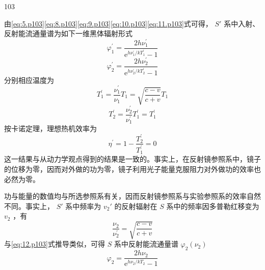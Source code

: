 \begin{solution}{103}
\begin{subsolution}
\begin{equation}
            \label{eq:11.p103}
        \end{equation}
        由\eqref{eq:5.p103}\eqref{eq:8.p103}\eqref{eq:9.p103}\eqref{eq:10.p103}\eqref{eq:11.p103}式可得， $S'$ 系中入射、反射能流通量谱为如下一维黑体辐射形式
        \begin{equation}
            \varphi_ {1} ^ {\prime} = \frac {2 h \nu_ {1} ^ {\prime}}{\mathrm{e} ^ {h \nu_ {1} ^ {\prime} / k T _ {1} ^ {\prime}} - 1}
            \label{eq:12.p103}
        \end{equation}
        \begin{equation}
            \varphi_ {2} ^ {\prime} = \frac {2 h \nu_ {2} ^ {\prime}}{\mathrm{e} ^ {h \nu_ {2} ^ {\prime} / k T _ {2} ^ {\prime}} - 1}
            \label{eq:13.p103}
        \end{equation}
        分别相应温度为
        \begin{equation}
            T _ {1} ^ {\prime} = \frac {\nu_ {1} ^ {\prime}}{\nu_ {1}} T _ {1} = \sqrt {\frac {c - v}{c + v}} T _ {1}
            \label{eq:14.p103}
        \end{equation}
        \begin{equation}
            T _ {2} ^ {\prime} = \frac {\nu_ {2} ^ {\prime}}{\nu_ {1} ^ {\prime}} T _ {1} ^ {\prime} = T _ {1} ^ {\prime}
            \label{eq:15.p103}
        \end{equation}
        按卡诺定理，理想热机效率为
        \begin{equation}
            \eta^ {\prime} = 1 - \frac {T _ {2} ^ {\prime}}{T _ {1} ^ {\prime}} = 0
            \label{eq:16.p103}
        \end{equation}
        这一结果与从动力学观点得到的结果是一致的。事实上，在反射镜参照系中，镜子的位移为零，因而对外做的功为零，镜子利用光子能量克服阻力对外做功的效率也必然为零。
    \end{subsolution}
    \begin{subsolution}
        功与能量的数值均与所选参照系有关，因而反射镜参照系与实验参照系的效率自然不同。事实上， $S'$ 系中频率为 $v_{2}'$ 的反射辐射在 $S$ 系中的频率因多普勒红移变为 $v_{2}$ ，有
        \begin{equation}
            \frac {\nu_ {2}}{\nu_ {2} ^ {\prime}} = \sqrt {\frac {c - v}{c + v}}
            \label{eq:17.p103}
        \end{equation}
        与\eqref{eq:12.p103}式推导类似，可得 $S$ 系中反射能流通量谱 $\varphi_{2}(\nu_{2})$ 
        \begin{equation}
            \varphi_ {2} = \frac {2 h \nu_ {2}}{\mathrm{e} ^ {h \nu_ {2} / k T _ {2}} - 1}

\end{equation}
\end{subsolution}
\end{solution}
